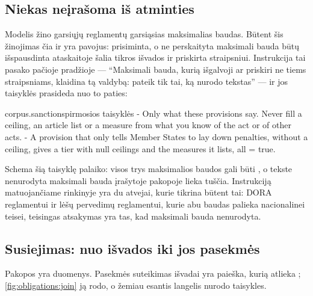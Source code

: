 \subsection{Niekas neįrašoma iš atminties}

Modelis žino garsiųjų reglamentų garsiąsias maksimalias baudas. Būtent šis žinojimas čia ir yra
pavojus: prisiminta, o ne perskaityta maksimali bauda būtų išspausdinta ataskaitoje šalia tikros
išvados ir priskirta straipsniui. Instrukcija tai pasako pačioje pradžioje --- \enquote{Maksimali
bauda, kurią išgalvoji ar priskiri ne tiems straipsniams, klaidina tą valdybą: pateik tik tai, ką
nurodo tekstas} --- ir jos taisyklės prasideda nuo to paties:

\begin{promptexcerpt}{corpus.sanctions}{pirmosios taisyklės}
- Only what these provisions say. Never fill a ceiling, an article list or a measure from what you know of the act or of other acts.
- A provision that only tells Member States to lay down penalties, without a ceiling, gives a tier with null ceilings and the measures it lists, all = true.
\end{promptexcerpt}

Schema šią taisyklę palaiko: visos trys maksimalios baudos gali būti , o tekste
nenurodyta maksimali bauda įrašytoje pakopoje lieka tuščia. Instrukciją matuojančiame rinkinyje
yra du atvejai, kurie tikrina būtent tai: DORA reglamentui ir lėšų pervedimų reglamentui, kurie
abu baudas palieka nacionalinei teisei, teisingas atsakymas yra tas, kad maksimali bauda
nenurodyta.

\subsection{Susiejimas: nuo išvados iki jos pasekmės}

Pakopos yra duomenys. Pasekmės suteikimas išvadai yra paieška, kurią atlieka
; \cref{fig:obligations:join} ją rodo, o žemiau esantis langelis nurodo
taisykles.

